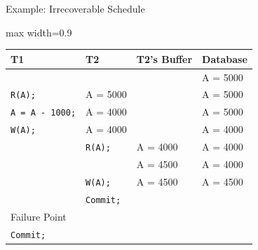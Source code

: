 \documentclass[aspectratio=169, xcolor=dvipsnames]{beamer}
\begin{document}
\begin{frame}{Example: Irrecoverable Schedule}
    \begin{center}
        \begin{adjustbox}{max width=0.9\textwidth}
        \begin{tabular}{|l|l|l|l|}
        \hline
        \textbf{T1} & \textbf{T2} & \textbf{T2's Buffer} & \textbf{Database} \\ \hline
        & & & A = 5000 \\ \hline
        \texttt{R(A);} & A = 5000 & & A = 5000 \\ \hline
        \texttt{A = A - 1000;} & A = 4000 & & A = 5000 \\ \hline
        \texttt{W(A);} & A = 4000 & & A = 4000 \\ \hline
        & \texttt{R(A);} & A = 4000 & A = 4000 \\ \hline
        & & A = 4500 & A = 4000 \\ \hline
        & \texttt{W(A);} & A = 4500 & A = 4500 \\ \hline
        & \texttt{Commit;} & & \\ \hline
        Failure Point & & & \\ \hline
        \texttt{Commit;} & & & \\ \hline
        \end{tabular}
        \end{adjustbox}
    \end{center}
    \vspace{1em}
\end{frame}
\end{document}
